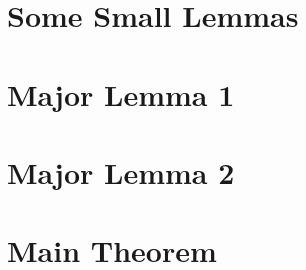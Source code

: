 \documentclass{article}
\begin{document}
\section*{Some Small Lemmas}



\section*{Major Lemma 1}

\section*{Major Lemma 2}

\section*{Main Theorem}


\end{document}
